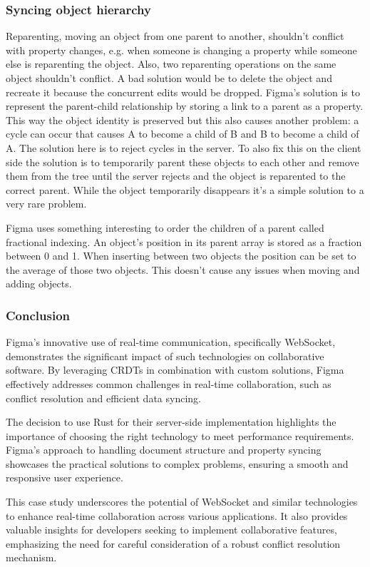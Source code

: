 \subsubsection*{Syncing object hierarchy}

Reparenting, moving an object from one parent to another, shouldn't conflict with property changes, e.g. when someone is changing a property while someone else is reparenting the object. Also, two reparenting operations on the same object shouldn't conflict. A bad solution would be to delete the object and recreate it because the concurrent edits would be dropped. Figma's solution is to represent the parent-child relationship by storing a link to a parent as a property. This way the object identity is preserved but this also causes another problem: a cycle can occur that causes A to become a child of B and B to become a child of A. The solution here is to reject cycles in the server. To also fix this on the client side the solution is to temporarily parent these objects to each other and remove them from the tree until the server rejects and the object is reparented to the correct parent. While the object temporarily disappears it's a simple solution to a very rare problem.

Figma uses something interesting to order the children of a parent called fractional indexing. An object's position in its parent array is stored as a fraction between 0 and 1. When inserting between two objects the position can be set to the average of those two objects. This doesn't cause any issues when moving and adding objects. \cite{figma-rtc}

\subsubsection*{Conclusion}

Figma's innovative use of real-time communication, specifically WebSocket, demonstrates the significant impact of such technologies on collaborative software. By leveraging CRDTs in combination with custom solutions, Figma effectively addresses common challenges in real-time collaboration, such as conflict resolution and efficient data syncing.

The decision to use Rust for their server-side implementation highlights the importance of choosing the right technology to meet performance requirements. Figma's approach to handling document structure and property syncing showcases the practical solutions to complex problems, ensuring a smooth and responsive user experience.

This case study underscores the potential of WebSocket and similar technologies to enhance real-time collaboration across various applications. It also provides valuable insights for developers seeking to implement collaborative features, emphasizing the need for careful consideration of a robust conflict resolution mechanism.
